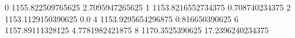 0 1155.822509765625 2.7095947265625
1 1153.8216552734375 0.708740234375
2 1153.1129150390625 0.0
4 1153.9295654296875 0.816650390625
6 1157.89111328125 4.7781982421875
8 1170.3525390625 17.2396240234375
